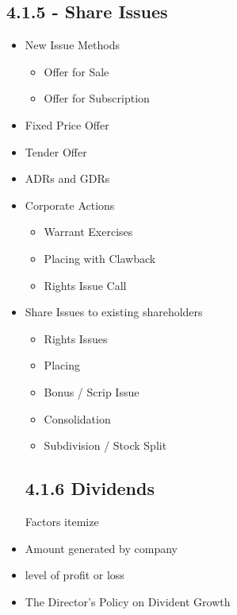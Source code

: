 \subsection{4.1.5 - Share Issues}

\begin{itemize}
\item New Issue Methods
\begin{itemize}
\item Offer for Sale
\item Offer for Subscription
\end{itemize}
\item Fixed Price Offer
\item Tender Offer
\item ADRs and GDRs
\item Corporate Actions
\begin{itemize}
\item Warrant Exercises
\item Placing with Clawback
\item Rights Issue Call
\end{itemize}
\item Share Issues to existing shareholders
\begin{itemize}
\item Rights Issues
\item Placing
\item Bonus / Scrip Issue
\item Consolidation
\item Subdivision / Stock Split
\end{itemize}

\subsection{4.1.6 Dividends}
Factors
{itemize}
\item Amount generated by company
\item level of profit or loss
\item The Director's Policy on Divident Growth
\end{itemize}

